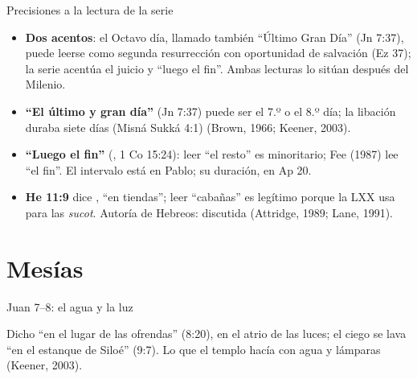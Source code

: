 \begin{frame}{Precisiones a la lectura de la serie}
\scriptsize
\begin{itemize}
\item \textbf{Dos acentos}: el Octavo día, llamado también ``Último Gran Día'' (Jn 7:37), puede leerse como segunda resurrección con oportunidad de salvación (Ez 37); la serie acentúa el juicio y ``luego el fin''. Ambas lecturas lo sitúan después del Milenio.
\item \textbf{``El último y gran día''} (Jn 7:37) puede ser el 7.º o el 8.º día; la libación duraba siete días (Misná Sukká 4:1) (Brown, 1966; Keener, 2003).
\item \textbf{``Luego el fin''} (, 1 Co 15:24): leer ``el resto'' es minoritario; Fee (1987) lee ``el fin''. El intervalo está en Pablo; su duración, en Ap 20.
\item \textbf{He 11:9} dice , ``en tiendas''; leer ``cabañas'' es legítimo porque la LXX usa  para las \emph{sucot}. Autoría de Hebreos: discutida (Attridge, 1989; Lane, 1991).
\end{itemize}
\end{frame}

\section{Mesías}

\begin{frame}{Juan 7--8: el agua y la luz}
\centering
{}\par\medskip
\scriptsize Dicho ``en el lugar de las ofrendas'' (8:20), en el atrio de las luces; el ciego se lava ``en el estanque de Siloé'' (9:7). Lo que el templo hacía con agua y lámparas  (Keener, 2003).
\end{frame}

